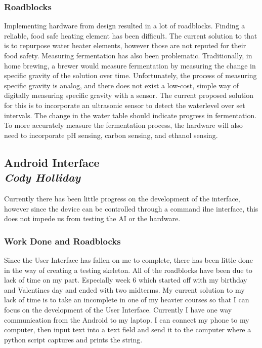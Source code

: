 \documentclass[draftclsnofoot,onecolumn,letterpaper,10pt]{IEEEtran}
\begin{document}
\subsubsection{Roadblocks}
Implementing hardware from design resulted in a lot of roadblocks.
Finding a reliable, food safe heating element has been difficult.
The current solution to that is to repurpose water heater elements, however those
are not reputed for their food safety.
Measuring fermentation has also been problematic.
Traditionally, in home brewing, a brewer would measure fermentation by measuring
the change in specific gravity of the solution over time.
Unfortunately, the process of measuring specific gravity is analog, and there does
not exist a low-cost, simple way of digitally measuring specific gravity with a
sensor.
The current proposed solution for this is to incorporate an ultrasonic sensor to
detect the waterlevel over set intervals.
The change in the water table should indicate progress in fermentation.
To more accurately measure the fermentation process, the hardware will also need
to incorporate pH sensing, carbon sensing, and ethanol sensing.

\subsection{Android Interface\\{\em\textbf{Cody Holliday}}}
Currently there has been little progress on the development of the interface, however since the device can be controlled through a command ilne interface, this does not impede us from testing the AI or the hardware.


\subsubsection{Work Done and Roadblocks}
Since the User Interface has fallen on me to complete, there has been little done in the way of creating a testing skeleton.
All of the roadblocks have been due to lack of time on my part. Especially week 6 which started off with my birthday
and Valentines day and ended with two midterms.
My current solution to my lack of time is to take an incomplete in one of my heavier courses so that I can focus on the development of the User Interface.
Currently I have one way communication from the Android to my laptop. I can connect my phone to my
computer, then input text into a text field and send it to the computer where a python script captures and prints the string.
\end{document}
